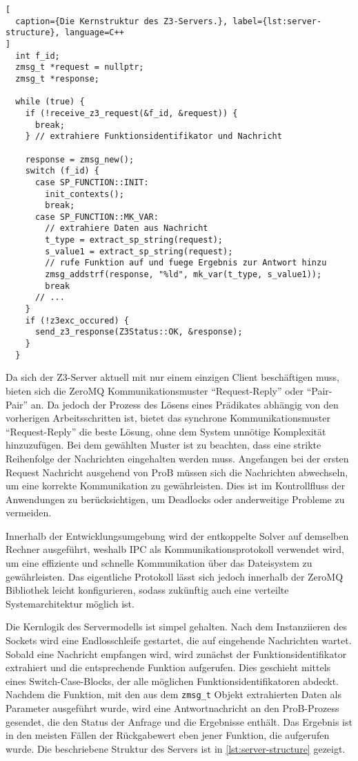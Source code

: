 \begin{lstlisting}[
  caption={Die Kernstruktur des Z3-Servers.}, label={lst:server-structure}, language=C++
]
  int f_id;
  zmsg_t *request = nullptr;
  zmsg_t *response;

  while (true) {
    if (!receive_z3_request(&f_id, &request)) {
      break;
    } // extrahiere Funktionsidentifikator und Nachricht

    response = zmsg_new();
    switch (f_id) {
      case SP_FUNCTION::INIT:
        init_contexts();
        break;
      case SP_FUNCTION::MK_VAR:
        // extrahiere Daten aus Nachricht
        t_type = extract_sp_string(request);
        s_value1 = extract_sp_string(request);
        // rufe Funktion auf und fuege Ergebnis zur Antwort hinzu
        zmsg_addstrf(response, "%ld", mk_var(t_type, s_value1));
        break
      // ...
    }
    if (!z3exc_occured) {
      send_z3_response(Z3Status::OK, &response);
    }
  }
\end{lstlisting}

Da sich der Z3-Server aktuell mit nur einem einzigen Client beschäftigen muss,
bieten sich die ZeroMQ Kommunikationsmuster \enquote{Request-Reply} oder \enquote{Pair-Pair} an.
Da jedoch der Prozess des Lösens eines Prädikates abhängig von den vorherigen Arbeitsschritten ist,
bietet das synchrone Kommunikationsmuster \enquote{Request-Reply} die beste Lösung, ohne dem System unnötige Komplexität hinzuzufügen.
Bei dem gewählten Muster ist zu beachten, dass eine strikte Reihenfolge der Nachrichten eingehalten werden muss.
Angefangen bei der ersten Request Nachricht ausgehend von ProB müssen sich die Nachrichten abwechseln, um eine korrekte Kommunikation zu gewährleisten.
Dies ist im Kontrollfluss der Anwendungen zu berücksichtigen, um Deadlocks oder anderweitige Probleme zu vermeiden.

Innerhalb der Entwicklungsumgebung wird der entkoppelte Solver auf demselben Rechner ausgeführt,
weshalb IPC als Kommunikationsprotokoll verwendet wird, um eine effiziente und schnelle Kommunikation über das Dateisystem zu gewährleisten.
Das eigentliche Protokoll lässt sich jedoch innerhalb der ZeroMQ Bibliothek leicht konfigurieren, sodass zukünftig auch eine verteilte Systemarchitektur möglich ist.

Die Kernlogik des Servermodells ist simpel gehalten.
Nach dem Instanziieren des Sockets wird eine Endlosschleife gestartet, die auf eingehende Nachrichten wartet.
Sobald eine Nachricht empfangen wird, wird zunächst der Funktionsidentifikator extrahiert und die entsprechende Funktion aufgerufen.
Dies geschieht mittels eines Switch-Case-Blocks, der alle möglichen Funktionsidentifikatoren abdeckt.
Nachdem die Funktion, mit den aus dem \texttt{zmsg\_t} Objekt extrahierten Daten als Parameter ausgeführt wurde,
wird eine Antwortnachricht an den ProB-Prozess gesendet, die den Status der Anfrage und die Ergebnisse enthält.
Das Ergebnis ist in den meisten Fällen der Rückgabewert eben jener Funktion, die aufgerufen wurde.
Die beschriebene Struktur des Servers ist in \cref{lst:server-structure} gezeigt.

